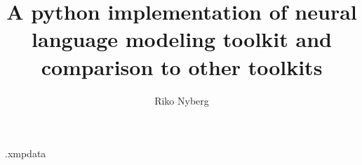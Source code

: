 \begin{filecontents*}{\jobname.xmpdata}
\end{filecontents*}
\documentclass[oneside,pdfa]{aaltoseries}
\makeatletter
{}
\hypersetup{hidelinks}                %
\makeatother
\usepackage[finnish,english]{babel}   %
\usepackage{setspace}                 %
\usepackage{afterpage}                %
\usepackage[style=authoryear]{biblatex} %
\graphicspath{ {./images/} }
\usepackage{subfig}
\usepackage{csquotes}
\usepackage{amsmath}
\usepackage[table,xcdraw]{xcolor}
\usepackage{listings} %

\author{Riko Nyberg}
\title{A python implementation of neural language modeling toolkit and comparison to other toolkits}






\thispagestyle{empty}
\setcounter{page}{0}  %

